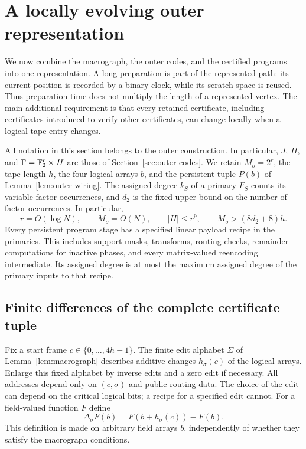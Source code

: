 \section{A locally evolving outer representation}\label{sec:outer-representation}

We now combine the macrograph, the outer codes, and the certified programs
into one representation. A long preparation is part of the represented
path: its current position is recorded by a binary clock, while its scratch
space is reused. Thus preparation time does not multiply the length of a
represented vertex. The main additional requirement is that every retained
certificate, including certificates introduced to verify other
certificates, can change locally when a logical tape entry changes.

All notation in this section belongs to the outer construction. In
particular, $J$, $H$, and $\Gamma=\mathbb{F}_2^r\rtimes H$ are those of
Section~\ref{sec:outer-codes}. We retain $M_o=2^r$, the tape length $h$,
the four logical arrays $b$, and the persistent tuple $P(b)$ of
Lemma~\ref{lem:outer-wiring}. The assigned degree $k_S$ of a primary
$F_S$ counts its variable factor occurrences, and $d_2$ is the fixed upper
bound on the number of factor occurrences. In particular,
\[
 r=O(\log N),\qquad M_o=O(N),\qquad |H|\leq r^9,
 \qquad M_o>(8d_2+8)h.
\]
Every persistent program stage has a specified linear payload recipe in
the primaries. This includes support masks, transforms, routing checks,
remainder computations for inactive phases, and every matrix-valued
reencoding intermediate. Its assigned degree is at most the maximum
assigned degree of the primary inputs to that recipe.

\subsection{Finite differences of the complete certificate tuple}

Fix a start frame $c\in\{0,\ldots,4h-1\}$. The finite edit alphabet
$\Sigma$ of Lemma~\ref{lem:macrograph} describes additive changes
$h_\sigma(c)$ of the logical arrays. Enlarge this fixed alphabet by inverse
edits and a zero edit if necessary. All addresses depend only on
$(c,\sigma)$ and public routing data. The choice of the edit can depend on
the critical logical bits; a recipe for a specified edit cannot.
For a field-valued function $F$ define
\[
 \Delta_\sigma F(b)=F(b+h_\sigma(c))-F(b).
\]
This definition is made on arbitrary field arrays $b$, independently of
whether they satisfy the macrograph conditions.

